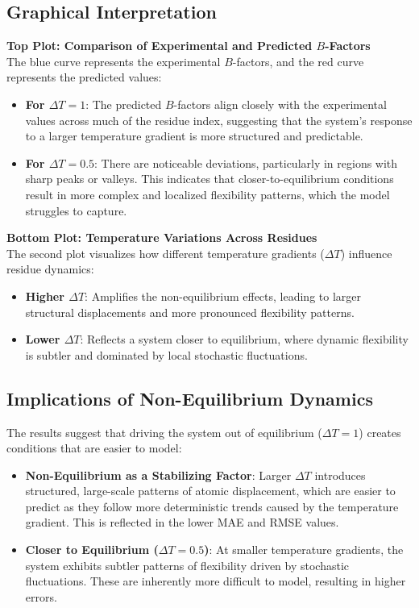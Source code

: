 \documentclass[English, Lau, oneside]{sapthesis}
\begin{document}
\subsection{Graphical Interpretation}
\textbf{Top Plot: Comparison of Experimental and Predicted \( B \)-Factors}\\
The blue curve represents the experimental \( B \)-factors, and the red curve represents the predicted values:
\begin{itemize}
    \item \textbf{For \(\Delta T = 1\)}: The predicted \( B \)-factors align closely with the experimental values across much of the residue index, suggesting that the system's response to a larger temperature gradient is more structured and predictable.
    \item \textbf{For \(\Delta T = 0.5\)}: There are noticeable deviations, particularly in regions with sharp peaks or valleys. This indicates that closer-to-equilibrium conditions result in more complex and localized flexibility patterns, which the model struggles to capture.
\end{itemize}

\textbf{Bottom Plot: Temperature Variations Across Residues}\\
The second plot visualizes how different temperature gradients (\(\Delta T\)) influence residue dynamics:
\begin{itemize}
    \item \textbf{Higher \(\Delta T\)}: Amplifies the non-equilibrium effects, leading to larger structural displacements and more pronounced flexibility patterns.
    \item \textbf{Lower \(\Delta T\)}: Reflects a system closer to equilibrium, where dynamic flexibility is subtler and dominated by local stochastic fluctuations.
\end{itemize}

\subsection{Implications of Non-Equilibrium Dynamics}
The results suggest that driving the system out of equilibrium (\(\Delta T = 1\)) creates conditions that are easier to model:
\begin{itemize}
    \item \textbf{Non-Equilibrium as a Stabilizing Factor}: Larger \(\Delta T\) introduces structured, large-scale patterns of atomic displacement, which are easier to predict as they follow more deterministic trends caused by the temperature gradient. This is reflected in the lower MAE and RMSE values.
    \item \textbf{Closer to Equilibrium (\(\Delta T = 0.5\))}: At smaller temperature gradients, the system exhibits subtler patterns of flexibility driven by stochastic fluctuations. These are inherently more difficult to model, resulting in higher errors.
\end{itemize}
\end{document}
